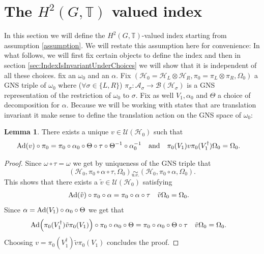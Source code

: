 \documentclass[12pt,a4paper,twoside]{article}
\let\originalleft\left
\let\originalright\right
\renewcommand{\left}{\mathopen{}\mathclose\bgroup\originalleft}
\renewcommand{\right}{\aftergroup\egroup\originalright}
\newcommand{\UU}{\mathcal U}
\newcommand{\BB}{\mathcal B}
\newcommand{\HH}{\mathcal H}
\newcommand{\TT}{\mathbb T}
\renewcommand{\AA}{\mathcal A}
\newcommand{\Ad}[1]{\textrm{Ad}\left(#1\right)}
\newcommand{\ue}{\underset{\text{u.e.}}{\sim}}
\theoremstyle{definition}
\newtheorem{lemma}[theorem]{Lemma}
\numberwithin{equation}{section}
\begin{document}
\section{The $H^2(G,\TT)$ valued index}\label{sec:ProofFirstStatement}
In this section we will define the $H^2(G,\TT)$-valued index starting from assumption \ref{assumption}. We will restate this assumption here for convenience:
\assumptionOne*
In what follows, we will first fix certain objects to define the index and then in section \ref{sec:IndexIsInvariantUnderChoices} we will show that it is independent of all these choices. fix an $\omega_0$ and an $\alpha$. Fix $(\HH_0=\HH_L\otimes\HH_R,\pi_0=\pi_L\otimes\pi_R,\Omega_0)$ a GNS triple of $\omega_0$ where ($\forall\sigma\in\{L,R\}$) $\pi_\sigma:\AA_\sigma\rightarrow\BB(\HH_\sigma)$ is a GNS representation of the restriction of $\omega_0$ to $\sigma$. Fix as well $V_1,\alpha_0$ and $\Theta$ a choice of decomposition for $\alpha$. Because we will be working with states that are translation invariant it make sense to define the translation action on the GNS space of $\omega_0$:
\begin{lemma}\label{lem:Definition_v}
	There exists a unique $v\in\UU(\HH_0)$ such that
	\begin{align}
		\Ad{v}\circ\pi_0&=\pi_0\circ\alpha_0\circ\Theta\circ\tau\circ\Theta^{-1}\circ\alpha_0^{-1}&&\text{and}&\pi_0(V_1)v\pi_0(V_1^\dagger)\Omega_0&=\Omega_0.
	\end{align}
\end{lemma}
\begin{proof}
	Since $\omega\circ\tau=\omega$ we get by uniqueness of the GNS triple that
	\begin{equation}
		(\HH_0,\pi_0\circ\alpha\circ\tau,\Omega_0)\ue (\HH_0,\pi_0\circ\alpha,\Omega_0).
	\end{equation}
	This shows that there exists a $\tilde{v}\in\UU(\HH_0)$ satisfying
	\begin{align}
		\Ad{\tilde{v}}\circ\pi_0\circ\alpha&=\pi_0\circ\alpha\circ\tau&\tilde{v}\Omega_0&=\Omega_0.
	\end{align}
	Since $\alpha=\Ad{V_1}\circ\alpha_0\circ\Theta$ we get that
	\begin{align}
		\Ad{\pi_0(V_1^\dagger)\tilde{v}\pi_0(V_1)}\circ\pi_0\circ\alpha_0\circ\Theta&=\pi_0\circ\alpha_0\circ\Theta\circ\tau&\tilde{v}\Omega_0&=\Omega_0.
	\end{align}
	Choosing $v=\pi_0(V_1^\dagger)\tilde{v}\pi_0(V_1)$  concludes the proof.
\end{proof}
\end{document}
